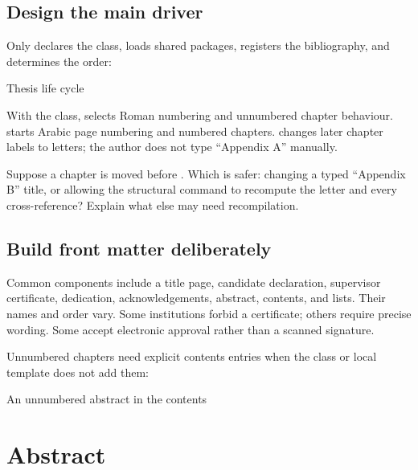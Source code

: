 \section{Design the main driver}

Only  declares the class, loads shared packages, registers the
bibliography, and determines the order:

\begin{latexcode}{Thesis life cycle}

\frontmatter


\tableofcontents
\listoffigures
\listoftables

\mainmatter




\appendix


\backmatter
\printbibliography

\end{latexcode}

With the  class,  selects Roman numbering and
unnumbered chapter behaviour.  starts Arabic page numbering and
numbered chapters.  changes later chapter labels to letters; the
author does not type ``Appendix A'' manually.

\begin{pausepredict}
Suppose a chapter is moved before . Which is safer: changing a
typed ``Appendix B'' title, or allowing the structural command to recompute the
letter and every cross-reference? Explain what else may need recompilation.
\end{pausepredict}

\section{Build front matter deliberately}

Common components include a title page, candidate declaration, supervisor
certificate, dedication, acknowledgements, abstract, contents, and lists. Their
names and order vary. Some institutions forbid a certificate; others require
precise wording. Some accept electronic approval rather than a scanned
signature.

Unnumbered chapters need explicit contents entries when the class or local
template does not add them:

\begin{latexcode}{An unnumbered abstract in the contents}
\chapter*{Abstract}
\end{latexcode}

